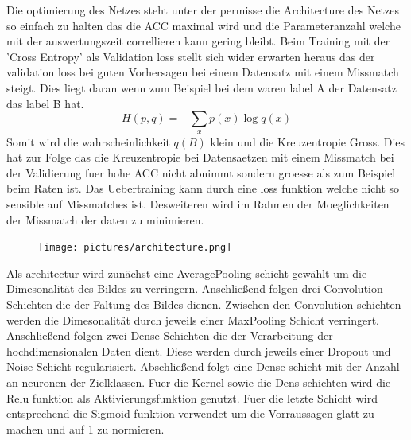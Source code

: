 Die optimierung des Netzes steht unter der permisse die Architecture des Netzes
so einfach zu halten das die ACC maximal wird und die Parameteranzahl welche mit
der auswertungszeit correllieren kann gering bleibt. 
Beim Training mit der 'Cross Entropy' als Validation loss stellt sich wider
erwarten heraus das der validation loss bei guten Vorhersagen bei einem
Datensatz mit einem Missmatch steigt. 
Dies liegt daran wenn zum Beispiel bei dem waren label A der Datensatz das label
B hat. 
\begin{equation}
		H(p,q) = -\sum_x p(x) \log q(x)
\end{equation}
Somit wird die wahrscheinlichkeit $q(B)$ klein und die Kreuzentropie Gross.
Dies hat zur Folge das die Kreuzentropie bei Datensaetzen mit einem Missmatch
bei der Validierung fuer hohe ACC nicht abnimmt sondern groesse als zum Beispiel
beim Raten ist.
Das Uebertraining kann durch eine loss funktion welche nicht so sensible auf
Missmatches ist. 
Desweiteren wird im Rahmen der Moeglichkeiten der Missmatch der daten zu
minimieren.

\begin{figure}[h]
		\centering
		\texttt{[image: pictures/architecture.png]}
		\caption{}
		\label{fig:}
\end{figure}

Als architectur wird zunächst eine AveragePooling schicht gewählt um die
Dimesonalität des Bildes zu verringern.
Anschließend folgen drei Convolution Schichten die der Faltung des Bildes
dienen. 
Zwischen den Convolution schichten werden die Dimesonalität durch jeweils einer
MaxPooling Schicht verringert. 
Anschließend folgen zwei Dense Schichten die der Verarbeitung der
hochdimensionalen Daten dient. 
Diese werden durch jeweils einer Dropout und Noise Schicht regularisiert. 
Abschließend folgt eine Dense schicht mit der Anzahl an neuronen der
Zielklassen.
Fuer die Kernel sowie die Dens schichten wird die Relu funktion als
Aktivierungsfunktion genutzt.
Fuer die letzte Schicht wird entsprechend die Sigmoid funktion verwendet um die
Vorraussagen glatt zu machen und auf 1 zu normieren.
